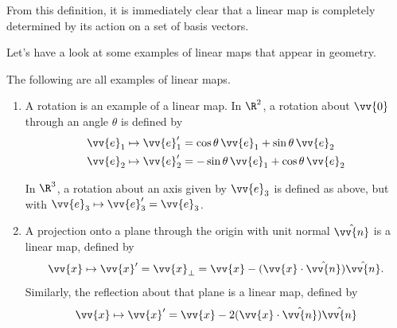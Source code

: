 From this definition, it is immediately clear that a linear map is completely determined by its action on a set of basis vectors.

Let's have a look at some examples of linear maps that appear in geometry.

\begin{example}
The following are all examples of linear maps.
\begin{enumerate}[label=(\roman*)]
    \item A rotation is an example of a linear map. In $\R^2$, a rotation about $\vv{0}$ through an angle $\theta$ is defined by
    \begin{align*}
        \vv{e}_1 \mapsto \vv{e}_1' &= \cos \theta \, \vv{e}_1 + \sin \theta \, \vv{e}_2 \\
        \vv{e}_2 \mapsto \vv{e}_2' &= -\sin \theta \, \vv{e}_1 + \cos \theta \, \vv{e}_2
    \end{align*}
    
    \begin{center}
      \end{center}
    
      In $\R^3$, a rotation about an axis given by $\vv{e}_3$ is defined as above, but with $\vv{e}_3 \mapsto \vv{e}_3'= \vv{e}_3$.

      \item A projection onto a plane through the origin with unit normal $\hat{\vv{n}}$ is a linear map, defined by
      $$
      \vv{x} \mapsto \vv{x}'= \vv{x}_{\perp} = \vv{x} - (\vv{x} \cdot \hat{\vv{n}}) \hat{\vv{n}}.
        $$
        Similarly, the reflection about that plane is a linear map, defined by
        $$
        \vv{x} \mapsto \vv{x}' = \vv{x} - 2(\vv{x} \cdot \hat{\vv{n}}) \hat{\vv{n}}
        $$


\end{enumerate}
\end{example}
